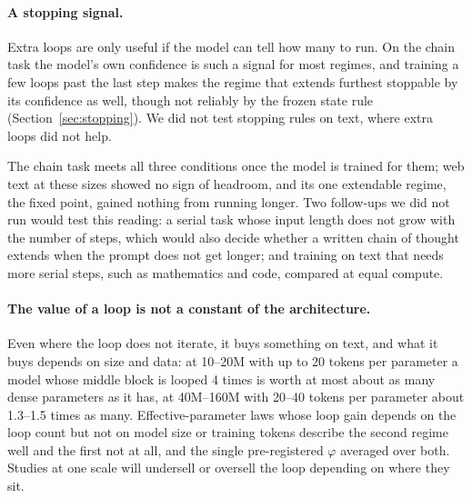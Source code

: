 \paragraph{A stopping signal.} Extra loops are only useful if the model can tell how many to run. On the chain task the
model's own confidence is such a signal for most regimes, and training a few loops past the last step makes the
regime that extends furthest stoppable by its confidence as well, though not reliably by the frozen state rule
(Section~\ref{sec:stopping}). We did not test stopping rules on text,
where extra loops did not help.

The chain task meets all three conditions once the model is trained for them; web text at these sizes showed no sign
of headroom, and its one extendable regime, the fixed point, gained nothing from running longer. Two follow-ups we did
not run would test this reading: a serial task whose input length does not grow with the number of steps, which would
also decide whether a written chain of thought extends when the prompt does not get longer; and training on text that
needs more serial steps, such as mathematics and code, compared at equal compute.

\paragraph{The value of a loop is not a constant of the architecture.} Even where the loop does not iterate, it buys
something on text, and what it buys depends on size and data: at 10--20M with up to 20 tokens per parameter a model whose
middle block is looped 4 times is worth at most about as many dense parameters as it has, at 40M--160M with 20--40
tokens per parameter about 1.3--1.5 times as many.
Effective-parameter laws whose loop gain depends on the loop count but not on model size or training tokens describe
the second regime well and the first not at all, and the single pre-registered $\varphi$ averaged over both. Studies at one scale will undersell or oversell the loop
depending on where they sit.

